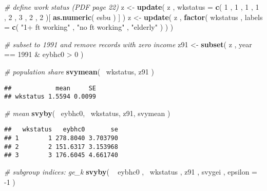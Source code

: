 \documentclass[]{book}
\newenvironment{Shaded}{\begin{snugshade}}{\end{snugshade}}
\newcommand{\KeywordTok}[1]{\textcolor[rgb]{0.13,0.29,0.53}{\textbf{{#1}}}}
\newcommand{\DataTypeTok}[1]{\textcolor[rgb]{0.13,0.29,0.53}{{#1}}}
\newcommand{\DecValTok}[1]{\textcolor[rgb]{0.00,0.00,0.81}{{#1}}}
\newcommand{\StringTok}[1]{\textcolor[rgb]{0.31,0.60,0.02}{{#1}}}
\newcommand{\CommentTok}[1]{\textcolor[rgb]{0.56,0.35,0.01}{\textit{{#1}}}}
\newcommand{\NormalTok}[1]{{#1}}
\theoremstyle{definition}
\theoremstyle{definition}
\theoremstyle{remark}
\begin{document}
\begin{Shaded}
\begin{Highlighting}[]
\CommentTok{# define work status (PDF page 22)}
\NormalTok{z <-}\StringTok{ }\KeywordTok{update}\NormalTok{( z , }\DataTypeTok{wkstatus =} \KeywordTok{c}\NormalTok{( }\DecValTok{1} \NormalTok{, }\DecValTok{1} \NormalTok{, }\DecValTok{1} \NormalTok{, }\DecValTok{1} \NormalTok{, }\DecValTok{2} \NormalTok{, }\DecValTok{3} \NormalTok{, }\DecValTok{2} \NormalTok{, }\DecValTok{2} \NormalTok{)[ }\KeywordTok{as.numeric}\NormalTok{( esbu ) ] )}
\NormalTok{z <-}\StringTok{ }\KeywordTok{update}\NormalTok{( z , }\KeywordTok{factor}\NormalTok{( wkstatus , }\DataTypeTok{labels =} \KeywordTok{c}\NormalTok{( }\StringTok{"1+ ft working"} \NormalTok{, }\StringTok{"no ft working"} \NormalTok{, }\StringTok{"elderly"} \NormalTok{) ) )}

\CommentTok{# subset to 1991 and remove records with zero income}
\NormalTok{z91 <-}\StringTok{ }\KeywordTok{subset}\NormalTok{( z , year ==}\StringTok{ }\DecValTok{1991} \NormalTok{&}\StringTok{ }\NormalTok{eybhc0 >}\StringTok{ }\DecValTok{0} \NormalTok{)}

\CommentTok{# population share}
\KeywordTok{svymean}\NormalTok{( ~wkstatus, z91 )}
\end{Highlighting}
\end{Shaded}

\begin{verbatim}
##            mean     SE
## wkstatus 1.5594 0.0099
\end{verbatim}

\begin{Shaded}
\begin{Highlighting}[]
\CommentTok{# mean}
\KeywordTok{svyby}\NormalTok{( ~eybhc0, ~wkstatus, z91, svymean )}
\end{Highlighting}
\end{Shaded}

\begin{verbatim}
##   wkstatus   eybhc0       se
## 1        1 278.8040 3.703790
## 2        2 151.6317 3.153968
## 3        3 176.6045 4.661740
\end{verbatim}

\begin{Shaded}
\begin{Highlighting}[]
\CommentTok{# subgroup indices: ge_k}
\KeywordTok{svyby}\NormalTok{( ~}\StringTok{ }\NormalTok{eybhc0 , ~wkstatus , z91 , svygei , }\DataTypeTok{epsilon =} \NormalTok{-}\DecValTok{1} \NormalTok{)}
\end{Highlighting}
\end{Shaded}
\end{document}
